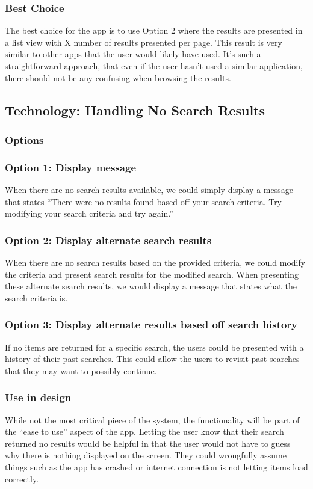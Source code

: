\documentclass[journal,compsoc, 10pt, draftclsnofoot, onecolumn]{IEEEtran}
\begin{document}
\subsubsection{Best Choice}
The best choice for the app is to use Option 2 where the results are presented in 
a list view with X number of results presented per page. This result is very 
similar to other apps that the user would likely have used. It's such a 
straightforward approach, that even if the user hasn't used a similar 
application, there should not be any confusing when browsing the results. 

\subsection{Technology: Handling No Search Results}
\subsubsection{Options}

\subsubsection*{Option 1: Display message}
When there are no search results available, we could simply display a message 
that states ``There were no results found based off your search criteria. Try 
modifying your search criteria and try again.''
\subsubsection*{Option 2: Display alternate search results}
When there are no search results based on the provided criteria, we could 
modify the criteria and present search results for the modified search. When 
presenting these alternate search results, we would display a message that 
states what the search criteria is.
\subsubsection*{Option 3: Display alternate results based off search history}
If no items are returned for a specific search, the users could be presented 
with a history of their past searches. This could allow the users to revisit 
past searches that they may want to possibly continue.
\subsubsection{Use in design}
While not the most critical piece of the system, the functionality will be part 
of the ``ease to use'' aspect of the app. Letting the user know that their 
search returned no results would be helpful in that the user would not have to 
guess why there is nothing displayed on the screen. They could wrongfully 
assume things such as the app has crashed or internet connection is not 
letting items load correctly.
\end{document}

